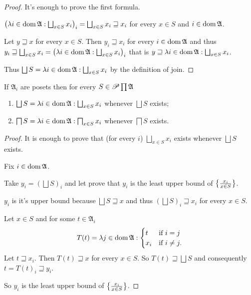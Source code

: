 \begin{proof}
It's enough to prove the first formula.

$\left(\lambda i\in\operatorname{dom}\mathfrak{A}:\bigsqcup_{x\in S}x_{i}\right)_{i}=\bigsqcup_{x\in S}x_{i}\sqsupseteq x_{i}$
for every $x\in S$ and $i\in\operatorname{dom}\mathfrak{A}$.

Let $y\sqsupseteq x$ for every $x\in S$. Then $y_{i}\sqsupseteq x_{i}$
for every $i\in\operatorname{dom}\mathfrak{A}$ and thus $y_{i}\sqsupseteq\bigsqcup_{x\in S}x_{i}=\left(\lambda i\in\operatorname{dom}\mathfrak{A}:\bigsqcup_{x\in S}x_{i}\right)_{i}$
that is $y\sqsupseteq\lambda i\in\operatorname{dom}\mathfrak{A}:\bigsqcup_{x\in S}x_{i}$.

Thus $\bigsqcup S=\lambda i\in\operatorname{dom}\mathfrak{A}:\bigsqcup_{x\in S}x_{i}$
by the definition of join.\end{proof}
\begin{cor}
\label{prod-join2}If $\mathfrak{A}_{i}$ are posets then for every
$S\in\mathscr{P}\prod\mathfrak{A}$
\begin{enumerate}
\item $\bigsqcup S=\lambda i\in\operatorname{dom}\mathfrak{A}:\bigsqcup_{x\in S}x_{i}$
whenever $\bigsqcup S$ exists;
\item $\bigsqcap S=\lambda i\in\operatorname{dom}\mathfrak{A}:\bigsqcap_{x\in S}x_{i}$
whenever $\bigsqcap S$ exists.
\end{enumerate}
\end{cor}
\begin{proof}
It is enough to prove that (for every $i$) $\bigsqcup_{x\in S}x_{i}$
exists whenever $\bigsqcup S$ exists.

Fix $i\in\operatorname{dom}\mathfrak{A}$.

Take $y_{i}=\left(\bigsqcup S\right)_{i}$ and let prove that $y_{i}$
is the least upper bound of $\left\{ \frac{x_{i}}{x\in S}\right\}$.

$y_{i}$ is it's upper bound because $\bigsqcup S\sqsupseteq x$
and thus $\left(\bigsqcup S\right)_{i}\sqsupseteq x_{i}$ for every
$x\in S$.

Let $x\in S$ and for some $t\in\mathfrak{A}_{i}$
\[
T(t)=\lambda j\in\operatorname{dom}\mathfrak{A}:\begin{cases}
t & \text{if }i=j\\
x_{i} & \text{if }i\ne j.
\end{cases}
\]
Let $t\sqsupseteq x_{i}$. Then $T(t)\sqsupseteq x$ for every $x\in S$.
So $T(t)\sqsupseteq\bigsqcup S$ and consequently $t=T(t)_{i}\sqsupseteq y_{i}$.

So $y_{i}$ is the least upper bound of $\left\{ \frac{x_{i}}{x\in S}\right\}$.\end{proof}
